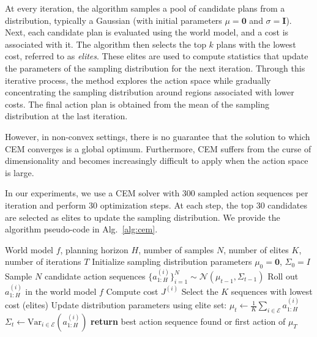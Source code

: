At every iteration, the algorithm samples a pool of candidate plans from a distribution, 
typically a Gaussian (with initial parameters $\mu=\mathbf{0}$ and $\sigma=\mathbf{I}$). Next, each candidate plan is evaluated using the world model, and a cost is 
associated with it. The algorithm then selects the top $k$ plans with the lowest cost, referred 
to as \textit{elites}. These elites are used to compute statistics that update the parameters of 
the sampling distribution for the next iteration. Through this iterative process, the method 
explores the action space while gradually concentrating the sampling distribution around 
regions associated with lower costs. The final action plan is obtained from the mean of the 
sampling distribution at the last iteration.

However, in non-convex settings, there is no guarantee that the solution to which CEM converges 
is a global optimum. Furthermore, CEM suffers from the curse of dimensionality and becomes 
increasingly difficult to apply when the action space is large.

In our experiments, we use a CEM solver with $300$ sampled action sequences per iteration and 
perform $30$ optimization steps. At each step, the top $30$ candidates are selected as elites 
to update the sampling distribution. We provide the algorithm pseudo-code in Alg.~\ref{alg:cem}.

\setcounter{algorithm}{1}
\begin{algorithm}[h]
\caption{Cross-Entropy Method (CEM) for Action Sequence Optimization}
\label{alg:cem}
\begin{algorithmic}[1]
\Require World model $f$, planning horizon $H$, number of samples $N$, number of elites $K$, number of iterations $T$
\State Initialize sampling distribution parameters $\mu_0 = \mathbf{0}$, $\Sigma_0 = I$
    \State Sample $N$ candidate action sequences $\{a_{1:H}^{(i)}\}_{i=1}^{N} \sim \mathcal{N}(\mu_{t-1}, \Sigma_{t-1})$
        \State Roll out $a_{1:H}^{(i)}$ in the world model $f$
        \State Compute cost $J^{(i)}$
    \EndFor
    \State Select the $K$ sequences with lowest cost (elites)
    \State Update distribution parameters using elite set:
    \State $\mu_t \leftarrow \frac{1}{K}\sum_{i \in \mathcal{E}} a_{1:H}^{(i)}$
    \State $\Sigma_t \leftarrow \text{Var}_{i \in \mathcal{E}}\left(a_{1:H}^{(i)}\right)$
\EndFor
\State \textbf{return} best action sequence found or first action of $\mu_T$
\end{algorithmic}
\end{algorithm}


